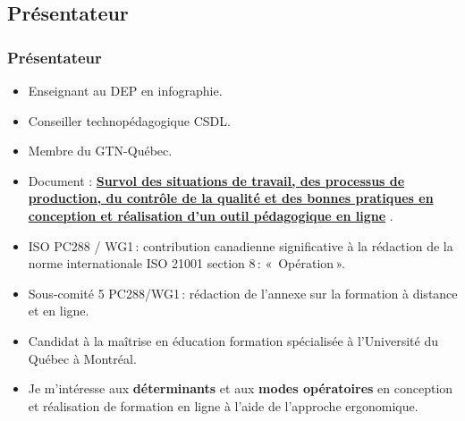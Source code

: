 	\subsection{Présentateur} 
		\begin{frame}[allowframebreaks]
			\frametitle{Présentateur}
			\begin {itemize}
				
                                \item Enseignant au DEP en  infographie.
                                \item Conseiller technopédagogique CSDL.
                                \item Membre du GTN-Québec.
                                \item Document : {\href{https://www.dropbox.com/s/22eg15w44mpo5dj/Rapport\%20GTN\%20Final.docx?dl=0}{\textbf{Survol des situations de travail, des processus de production, du contrôle de la qualité et des bonnes pratiques en conception et réalisation d’un outil pédagogique en ligne}}} .  
                                \framebreak
                                \item ISO PC288 / WG1\,: contribution canadienne significative à la rédaction de la norme internationale ISO 21001 section 8\,: «\, Opération\,».
                                \item Sous-comité 5 PC288/WG1\,: rédaction de l’annexe sur la formation à distance et en ligne.
                                \framebreak
                                \item Candidat à la maîtrise en éducation formation spécialisée à l'Université du Québec à Montréal.
                                \item Je m'intéresse aux \textbf{déterminants} et aux \textbf{modes opératoires} en conception et réalisation de formation en ligne à l’aide de l’approche ergonomique.



			\end{itemize}
		\end{frame}
			
